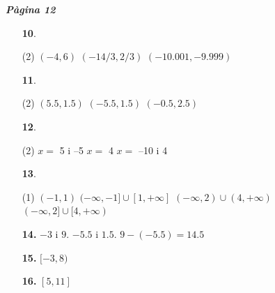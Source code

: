\documentclass[a4paper, pdf, twoside]{book}
\begin{document}
\begin{multicols}{2}

{\textbf{\em Pàgina 12}} \hrulefill
\begin{enumerate}
\vspace{0.25cm}



 \item[\fontfamily{phv}\selectfont\color{blue}\textbf{10}. ] 
 \begin{tasks}[column-sep=1em, item-indent=1.3333em](2)
	 \task $(-4,6)$
	 \task $(-14/3,2/3)$
	 \task $(-10.001,-9.999)$
\end{tasks}
 \end{enumerate}
\begin{enumerate}
\vspace{0.25cm}



 \item[\fontfamily{phv}\selectfont\color{blue}\textbf{11}. ] 
 \begin{tasks}[column-sep=1em, item-indent=1.3333em](2)
	 \task $(5.5,1.5)$
	 \task $(-5.5,1.5)$
	 \task $(-0.5,2.5)$
\end{tasks}
\vspace{0.25cm}



 \item[\fontfamily{phv}\selectfont\color{blue}\textbf{12}. ] 
 \begin{tasks}[column-sep=1em, item-indent=1.3333em](2)
	 \task $x=$ 5 i --5
	 \task $x=$ 4
	 \task $x=$ --10 i 4
\end{tasks}
\vspace{0.25cm}



 \item[\fontfamily{phv}\selectfont\color{blue}\textbf{13}. ] 
 \begin{tasks}[column-sep=1em, item-indent=1.3333em](1)
	 \task $(-1,1)$
	 \task* $(-\infty ,-1]\cup [1,+\infty ]$
	 \task* $(-\infty ,2)\cup (4,+\infty )$
	 \task* $(-\infty ,2]\cup [4,+\infty )$
\end{tasks}
\vspace{0.25cm}
\item[\fontfamily{phv}\selectfont\color{blue}\textbf{14. }] 
$-3$ i $9$. $-5.5$ i $1.5$. $9-(-5.5)=14.5$
\vspace{0.25cm}
\item[\fontfamily{phv}\selectfont\color{blue}\textbf{15. }] 
$[-3, 8)$
\vspace{0.25cm}
\item[\fontfamily{phv}\selectfont\color{blue}\textbf{16. }] 
$[5,11]$
\vspace{0.25cm}



\end{enumerate}
\end{multicols}
\end{document}
